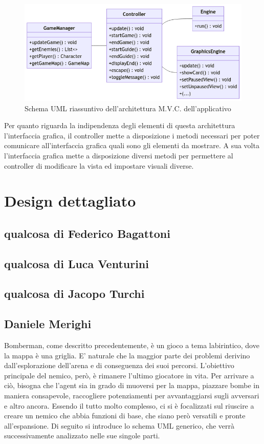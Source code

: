 \documentclass[a4paper,12pt]{report}
\begin{document}
\begin{figure}[h]
\centering{}
\includegraphics[width=\textwidth]{img/mvc.png}
\caption{Schema UML riassuntivo dell'architettura M.V.C. dell'applicativo}
\end{figure}

\par 
Per quanto riguarda la indipendenza degli elementi di questa architettura l'interfaccia grafica, il controller mette a disposizione i metodi necessari per poter comunicare all'interfaccia grafica quali sono gli elementi da mostrare. A sua volta l'interfaccia grafica mette a disposizione diversi metodi per permettere al controller di modificare la vista ed impostare visuali diverse.

\section{Design dettagliato}

\subsection{qualcosa di Federico Bagattoni}
\subsection{qualcosa di Luca Venturini}
\subsection{qualcosa di Jacopo Turchi}
\subsection{Daniele Merighi}

\par
Bomberman, come descritto precedentemente, è un gioco a tema labirintico, dove la mappa è una griglia. E’ naturale che la maggior parte dei problemi derivino dall'esplorazione dell’arena e di conseguenza dei suoi percorsi. L’obiettivo principale del nemico, però, è rimanere l’ultimo giocatore in vita. Per arrivare a ciò, bisogna che l’agent sia in grado di muoversi per la mappa, piazzare bombe in maniera consapevole, raccogliere potenziamenti per avvantaggiarsi sugli avversari e altro ancora. Essendo il tutto molto complesso, ci si è focalizzati sul riuscire a creare un nemico che abbia funzioni di base, che siano però versatili e pronte all’espansione. Di seguito si introduce lo schema UML generico, che verrà successivamente analizzato nelle sue singole parti.
\end{document}
